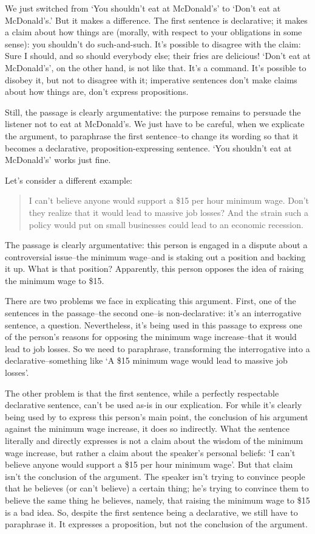 We just switched from `You shouldn't eat at McDonald's' to `Don't eat at McDonald's.' But it
makes a difference. The first sentence is declarative; it makes a claim about how things are
(morally, with respect to your obligations in some sense): you shouldn't do such-and-such. It's
possible to disagree with the claim: Sure I should, and so should everybody else; their fries are
delicious! `Don't eat at McDonald's', on the other hand, is not like that. It's a command. It's
possible to disobey it, but not to disagree with it; imperative sentences don't make claims about
how things are, don't express propositions.

Still, the passage is clearly argumentative: the purpose remains to persuade the listener not to eat
at McDonald's. We just have to be careful, when we explicate the argument, to paraphrase the first
sentence--to change its wording so that it becomes a declarative, proposition-expressing sentence.
`You shouldn't eat at McDonald's' works just fine.

Let's consider a different example:

\begin{quote}
\noindent
I can't believe anyone would support a \$15 per hour minimum wage. Don't they realize
that it would lead to massive job losses? And the strain such a policy would put on small
businesses could lead to an economic recession.
\end{quote}

The passage is clearly argumentative: this person is engaged in a dispute about a controversial
issue--the minimum wage--and is staking out a position and backing it up. What is that position?
Apparently, this person opposes the idea of raising the minimum wage to \$15.

There are two problems we face in explicating this argument. First, one of the sentences in the
passage--the second one--is non-declarative: it's an interrogative sentence, a question.
Nevertheless, it's being used in this passage to express one of the person's reasons for opposing
the minimum wage increase--that it would lead to job losses. So we need to paraphrase,
transforming the interrogative into a declarative--something like `A \$15 minimum wage would
lead to massive job losses'.

The other problem is that the first sentence, while a perfectly respectable declarative sentence,
can't be used as-is in our explication. For while it's clearly being used by to express this person's
main point, the conclusion of his argument against the minimum wage increase, it does so
indirectly. What the sentence literally and directly expresses is not a claim about the wisdom of
the minimum wage increase, but rather a claim about the speaker's personal beliefs: `I can't believe
anyone would support a \$15 per hour minimum wage'. But that claim isn't the conclusion of the
argument. The speaker isn't trying to convince people that he believes (or can't believe) a certain
thing; he's trying to convince them to believe the same thing he believes, namely, that raising the
minimum wage to \$15 is a bad idea. So, despite the first sentence being a declarative, we still have
to paraphrase it. It expresses a proposition, but not the conclusion of the argument.

